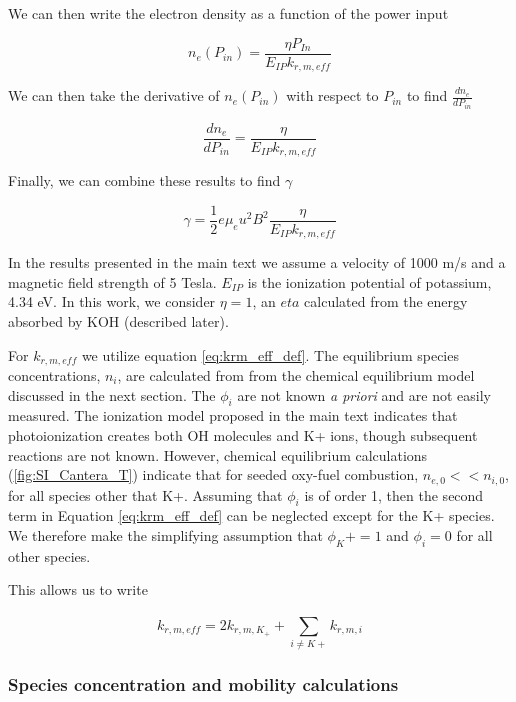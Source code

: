 We can then write the electron density as a function of the power input

\begin{equation}
n_{e}(P_{in}) = \frac{\eta P_{In}}{E_{IP}k_{r, m, eff}}
\end{equation}

We can then take the derivative of $n_{e}(P_{in})$ with respect to $P_{in}$ to find $\frac{dn_{e}}{dP_{in}}$

\begin{equation}
\frac{dn_{e}}{dP_{in}} = \frac{\eta}{E_{IP}k_{r, m, eff}}
\end{equation}

Finally, we can combine these results to find $\gamma$

\begin{equation}
  \label{eq:gamma-final}
\gamma = \frac{1}{2} e \mu_e u^2 B^2 \frac{\eta}{E_{IP}k_{r, m, eff}}
\end{equation}

In the results presented in the main text we assume a velocity of 1000 m/s and a magnetic field strength of 5 Tesla. $E_{IP}$ is the ionization potential of potassium, 4.34 eV. In this work, we consider $\eta =1$, an $eta$ calculated from the energy absorbed by KOH (described later). 

For $k_{r, m, eff}$ we utilize equation \ref{eq:krm_eff_def}. The equilibrium species concentrations, $n_i$, are calculated from from the chemical equilibrium model discussed in the next section.  The $\phi_i$ are not known \emph{a priori} and are not easily measured. The ionization model proposed in the main text indicates that photoionization creates both OH molecules and K+ ions, though subsequent reactions are not known. However, chemical equilibrium calculations (\ref{fig:SI_Cantera_T}) indicate that for seeded oxy-fuel combustion, $n_{e,0} << n_{i,0}$, for all species other that K+. Assuming that $\phi_i$ is of order 1, then the second term in Equation \ref{eq:krm_eff_def} can be neglected except for the K+ species. We therefore make the simplifying assumption that  $\phi_K+ = 1$ and $\phi_i = 0$ for all other species. 

This allows us to write

\begin{equation}
  \label{eq:krm_eff_final}
  k_{r, m, eff} = 2k_{r, m, K_{+}} + \sum_{i \neq K+}^{}k_{r, m, i}
\end{equation}


\subsubsection{Species concentration and mobility calculations}


